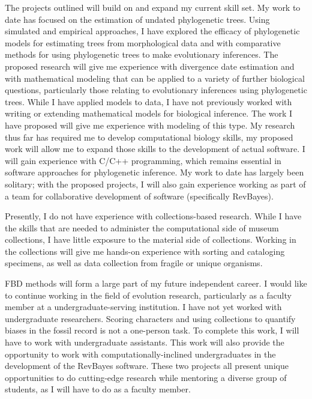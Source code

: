\documentclass[]{article}
\begin{document}
   The  projects outlined will build on and expand my current skill set. My work to date has focused on the estimation of undated phylogenetic trees. Using simulated and empirical approaches, I have explored the efficacy of phylogenetic models for estimating trees from morphological data and with comparative methods for using phylogenetic trees to make evolutionary inferences. The proposed research will give me experience with divergence date estimation and with mathematical modeling that can be applied to a variety of further biological questions, particularly those relating to evolutionary inferences using phylogenetic trees. While I have applied models to data, I have not previously worked with writing or extending mathematical models for biological inference. The work I have proposed will give me experience with modeling of this type. My research thus far has required me to develop computational biology skills, my proposed work will allow me to expand those skills to the development of actual software. I will gain experience with C/C++ programming, which remains essential in software approaches for phylogenetic inference. My work to date has largely been solitary; with the proposed projects, I will also gain experience working as part of a team for collaborative development of software (specifically RevBayes). \par
Presently, I do not have experience with collections-based research. While I have the skills that are needed to administer the computational side of museum collections, I have little exposure to the material side of collections. Working in the collections will give me hands-on experience with sorting and cataloging specimens, as well as data collection from fragile or unique organisms. \par
FBD methods will form a large part of my future independent career. I would like to continue working in the field of evolution research, particularly as a faculty member at a undergraduate-serving institution. I have not yet worked with undergraduate researchers. Scoring characters and using collections to quantify biases in the fossil record is not a one-person task. To complete this work, I will have to work with undergraduate assistants. This work will also provide the opportunity to work with computationally-inclined undergraduates in the development of the RevBayes software. These  two projects all present unique opportunities to do cutting-edge research while mentoring a diverse group of students, as I will have to do as a faculty member. \par	
	
\end{document}

